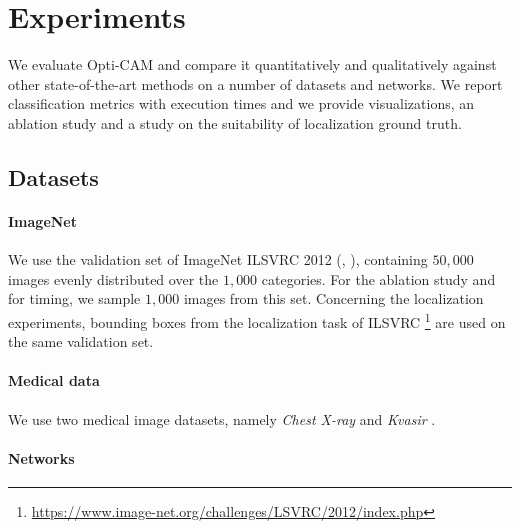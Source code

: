 \section{Experiments}
\label{sec:oc_exp}
We evaluate Opti-CAM and compare it quantitatively and qualitatively against other state-of-the-art 
methods on a number of datasets and networks. We report classification metrics with execution times 
and we provide visualizations, an ablation study and a study on the suitability of localization 
ground truth.

\subsection{Datasets}
\label{sec:oc_data}

\paragraph{ImageNet}

We use the validation set of ImageNet ILSVRC 2012 (\cite{krizhevsky2012imagenet}, \cite{ILSVRC15}), 
containing $50,000$ images evenly distributed over the $1,000$ categories. For the ablation study 
and for timing, we sample $1,000$ images from this set. Concerning the localization experiments, 
bounding boxes from the localization task of ILSVRC
\footnote{\url{https://www.image-net.org/challenges/LSVRC/2012/index.php}} are used on the same 
validation set.

\paragraph{Medical data}

We use two medical image datasets, namely \emph{Chest X-ray} \autocite{kermany2018labeled} and 
\emph{Kvasir} \autocite{pogorelov2017kvasir}. 


\paragraph{Networks}
\label{sec:oc_setup}

